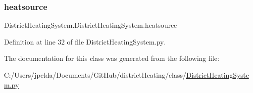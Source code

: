 \subsubsection{\texorpdfstring{heatsource}{heatsource}}
{\footnotesize\ttfamily District\+Heating\+System.\+District\+Heating\+System.\+heatsource}



Definition at line 32 of file District\+Heating\+System.\+py.



The documentation for this class was generated from the following file\+:\begin{DoxyCompactItemize}
\item 
C\+:/\+Users/jpelda/\+Documents/\+Git\+Hub/district\+Heating/class/\hyperlink{_district_heating_system_8py}{District\+Heating\+System.\+py}\end{DoxyCompactItemize}
